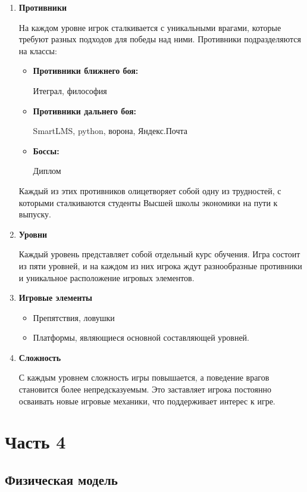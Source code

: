 \documentclass{article}
\begin{document}
\begin{enumerate}
    \item \textbf{Противники} \par
    На каждом уровне игрок сталкивается с уникальными врагами, которые требуют разных подходов для победы над ними.
    Противники подразделяются на классы:
    \begin{itemize}
        \item \textbf{Противники ближнего боя:} \par
        Итеграл, философия
        \item \textbf{Противники дальнего боя:} \par
        SmartLMS, python, ворона, Яндекс.Почта
        \item \textbf{Боссы:} \par
        Диплом
    \end{itemize}
    Каждый из этих противников олицетворяет собой одну из трудностей, с которыми сталкиваются студенты Высшей школы экономики на пути к выпуску.
    \item \textbf{Уровни} \par
    Каждый уровень представляет собой отдельный курс обучения. Игра состоит из пяти уровней, и на каждом из них игрока ждут разнообразные противники и уникальное расположение игровых элементов.
    \item \textbf{Игровые элементы} \par
    \begin{itemize}
        \item Препятствия, ловушки
        \item Платформы, являющиеся основной составляющей уровней.
    \end{itemize}
    \item \textbf{Сложность} \par
    С каждым уровнем сложность игры повышается, а поведение врагов становится более непредсказуемым. Это заставляет игрока постоянно осваивать новые игровые механики, что поддерживает интерес к игре.
\end{enumerate}

\section{Часть 4}

\subsection*{Физическая модель}
\end{document}
